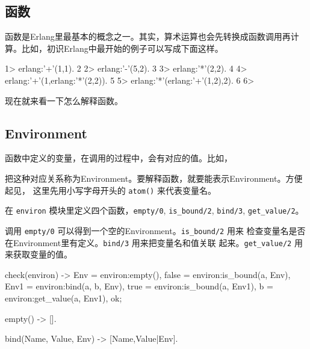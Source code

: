 \documentclass[preview,multi,crop=false,border=1in,class=memoir]{standalone}
\begin{document}
\begin{preview-page}
\section{函数}

函数是Erlang里最基本的概念之一。其实，算术运算也会先转换成函数调用再计
算。比如，初识Erlang中最开始的例子可以写成下面这样。

\begin{ErlangShellSession}
1> erlang:'+'(1,1).
2
2> erlang:'-'(5,2).
3
3> erlang:'*'(2,2).
4
4> erlang:'+'(1,erlang:'*'(2,2)).
5
5> erlang:'*'(erlang:'+'(1,2),2).
6
6>
\end{ErlangShellSession}


现在就来看一下怎么解释函数。


\subsection{Environment}

函数中定义的变量，在调用的过程中，会有对应的值。比如，



把这种对应关系称为Environment。要解释函数，就要能表示Environment。方便起见，
这里先用小写字母开头的 \verb|atom()| 来代表变量名。

\begin{Exercise}[title={environ},difficulty=2]
在 \verb|environ| 模块里定义四个函数，\verb|empty/0|, \verb|is_bound/2|,
\verb|bind/3|, \verb|get_value/2|。

调用 \verb|empty/0| 可以得到一个空的Environment。\verb|is_bound/2| 用来
检查变量名是否在Environment里有定义。\verb|bind/3| 用来把变量名和值关联
起来。\verb|get_value/2| 用来获取变量的值。

\begin{SourceCode}
check(environ) ->
    Env = environ:empty(),
    false = environ:is_bound(a, Env),
    Env1 = environ:bind(a, b, Env),
    true = environ:is_bound(a, Env1),
    b = environ:get_value(a, Env1),
    ok;
\end{SourceCode}
\end{Exercise}

\begin{Answer}

\begin{SourceCode}
empty() ->
    [].

bind(Name, Value, Env) ->
    [{Name,Value}|Env].


\end{SourceCode}
\end{Answer}
\end{preview-page}
\end{document}
